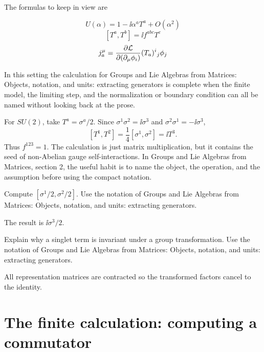 The formulas to keep in view are

\[
  U(\alpha)=1-\ii\alpha^aT^a+O(\alpha^2)
\]
\[
  [T^a,T^b]=\ii f^{abc}T^c
\]
\[
  j^\mu_a=\frac{\partial\mathcal L}{\partial(\partial_\mu\phi_i)}(T_a)^i{}_j\phi_j
\]

In this setting the calculation for Groups and Lie Algebras from Matrices: Objects, notation, and units: extracting generators is complete when the finite model, the limiting step, and the normalization or boundary condition can all be named without looking back at the prose.




\begin{example}
For \(SU(2)\), take \(T^a=\sigma^a/2\).  Since \(\sigma^1\sigma^2=\ii\sigma^3\) and \(\sigma^2\sigma^1=-\ii\sigma^3\),
\[
  [T^1,T^2]=\frac14[\sigma^1,\sigma^2]=\ii T^3.
\]
Thus \(f^{123}=1\).  The calculation is just matrix multiplication, but it contains the seed of non-Abelian gauge self-interactions.  In Groups and Lie Algebras from Matrices, section 2, the useful habit is to name the object, the operation, and the assumption before using the compact notation.
\end{example}



\begin{exercise}
Compute \([\sigma^1/2,\sigma^2/2]\).  Use the notation of Groups and Lie Algebras from Matrices: Objects, notation, and units: extracting generators.
\begin{answer}
The result is \(\ii\sigma^3/2\).
\end{answer}
\end{exercise}

\begin{exercise}
Explain why a singlet term is invariant under a group transformation.  Use the notation of Groups and Lie Algebras from Matrices: Objects, notation, and units: extracting generators.
\begin{answer}
All representation matrices are contracted so the transformed factors cancel to the identity.
\end{answer}
\end{exercise}



\section{The finite calculation: computing a commutator}

